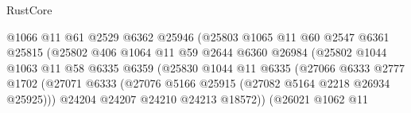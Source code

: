 \begin{lexlean}{RustCore}
\begin{coremodule}
                                        @1066
                                        @11
                                        @61
                                        @2529
                                        @6362
                                        @25946
                                        (@25803
                                          @1065
                                          @11
                                          @60
                                          @2547
                                          @6361
                                          @25815
                                          (@25802
                                            @406
                                            @1064
                                            @11
                                            @59
                                            @2644
                                            @6360
                                            @26984
                                            (@25802
                                              @1044
                                              @1063
                                              @11
                                              @58
                                              @6335
                                              @6359
                                              (@25830
                                                @1044
                                                @11
                                                @6335
                                                (@27066
                                                  @6333
                                                  @2777
                                                  @1702
                                                  (@27071
                                                    @6333
                                                    (@27076
                                                      @5166
                                                      @25915
                                                      (@27082 @5164 @2218 @26934 @25925)))
                                                  @24204
                                                  @24207
                                                  @24210
                                                  @24213
                                                  @18572))
                                              (@26021
                                                @1062
                                                @11

\end{coremodule}
\end{lexlean}
